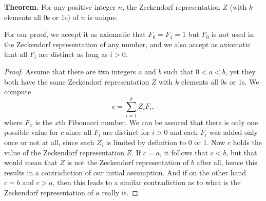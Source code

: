 \documentclass[12pt]{article}
\begin{document}
{\bf Theorem.} For any positive integer $n$, the Zeckendorf representation $Z$ (with $k$ elements all 0s or 1s) of $n$ is unique.

For our proof, we accept it as axiomatic that $F_0 = F_1 = 1$ but $F_0$ is not used in the Zeckendorf representation of any number, and we also accept as axiomatic that all $F_i$ are distinct as long as $i > 0$.

\begin{proof}
Assume that there are two integers $a$ and $b$ such that $0 < a < b$, yet they both have the same Zeckendorf representation $Z$ with $k$ elements all 0s or 1s. We compute $$c = \sum_{i = 1}^k Z_iF_i,$$ where $F_x$ is the $x$th Fibonacci number. We can be assured that there is only one possible value for $c$ since all $F_i$ are distinct for $i > 0$ and each $F_i$ was added only once or not at all, since each $Z_i$ is limited by definition to 0 or 1. Now $c$ holds the value of the Zeckendorf representation $Z$. If $c = a$, it follows that $c < b$, but that would mean that $Z$ is not the Zeckendorf representation of $b$ after all, hence this results in a contradiction of our initial assumption. And if on the other hand $c = b$ and $c > a$, then this leads to a similar contradiction as to what is the Zeckendorf representation of $a$ really is.
\end{proof}
\end{document}

